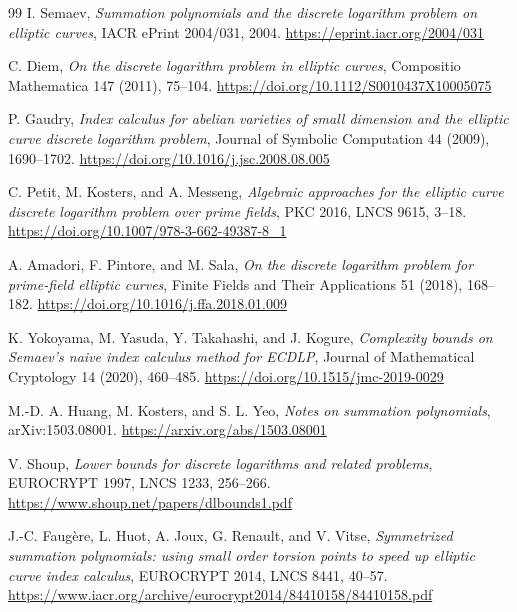 \documentclass[11pt]{article}
\begin{document}
\begin{thebibliography}{99}
I. Semaev,
\emph{Summation polynomials and the discrete logarithm problem on elliptic curves},
IACR ePrint 2004/031, 2004.
\url{https://eprint.iacr.org/2004/031}

C. Diem,
\emph{On the discrete logarithm problem in elliptic curves},
Compositio Mathematica 147 (2011), 75--104.
\url{https://doi.org/10.1112/S0010437X10005075}

P. Gaudry,
\emph{Index calculus for abelian varieties of small dimension and the elliptic
curve discrete logarithm problem},
Journal of Symbolic Computation 44 (2009), 1690--1702.
\url{https://doi.org/10.1016/j.jsc.2008.08.005}

C. Petit, M. Kosters, and A. Messeng,
\emph{Algebraic approaches for the elliptic curve discrete logarithm problem
over prime fields}, PKC 2016, LNCS 9615, 3--18.
\url{https://doi.org/10.1007/978-3-662-49387-8_1}

A. Amadori, F. Pintore, and M. Sala,
\emph{On the discrete logarithm problem for prime-field elliptic curves},
Finite Fields and Their Applications 51 (2018), 168--182.
\url{https://doi.org/10.1016/j.ffa.2018.01.009}

K. Yokoyama, M. Yasuda, Y. Takahashi, and J. Kogure,
\emph{Complexity bounds on Semaev's naive index calculus method for ECDLP},
Journal of Mathematical Cryptology 14 (2020), 460--485.
\url{https://doi.org/10.1515/jmc-2019-0029}

M.-D. A. Huang, M. Kosters, and S. L. Yeo,
\emph{Notes on summation polynomials}, arXiv:1503.08001.
\url{https://arxiv.org/abs/1503.08001}

V. Shoup,
\emph{Lower bounds for discrete logarithms and related problems},
EUROCRYPT 1997, LNCS 1233, 256--266.
\url{https://www.shoup.net/papers/dlbounds1.pdf}

J.-C. Faug\`ere, L. Huot, A. Joux, G. Renault, and V. Vitse,
\emph{Symmetrized summation polynomials: using small order torsion points to
speed up elliptic curve index calculus}, EUROCRYPT 2014, LNCS 8441, 40--57.
\url{https://www.iacr.org/archive/eurocrypt2014/84410158/84410158.pdf}
\end{thebibliography}
\end{document}
